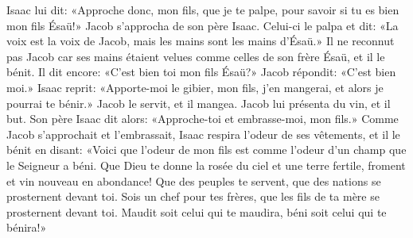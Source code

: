 Isaac lui dit: «Approche donc, mon fils, que je te palpe,
	pour savoir si tu es bien mon fils Ésaü!»
Jacob s’approcha de son père Isaac. Celui-ci le palpa et dit:
	«La voix est la voix de Jacob, mais les mains sont les mains d’Ésaü.»
Il ne reconnut pas Jacob
	car ses mains étaient velues comme celles de son frère Ésaü,
	et il le bénit.
Il dit encore: «C’est bien toi mon fils Ésaü?»
	Jacob répondit: «C’est bien moi.»
Isaac reprit: «Apporte-moi le gibier, mon fils,
	j’en mangerai, et alors je pourrai te bénir.»
Jacob le servit, et il mangea.
	Jacob lui présenta du vin, et il but.
Son père Isaac dit alors:
	«Approche-toi et embrasse-moi, mon fils.»
Comme Jacob s’approchait et l’embrassait,
	Isaac respira l’odeur de ses vêtements, et il le bénit en disant:
	«Voici que l’odeur de mon fils
		est comme l’odeur d’un champ que le Seigneur a béni.
Que Dieu te donne la rosée du ciel et une terre fertile,
	froment et vin nouveau en abondance!
Que des peuples te servent, que des nations se prosternent devant toi.
Sois un chef pour tes frères,
	que les fils de ta mère se prosternent devant toi.
Maudit soit celui qui te maudira, béni soit celui qui te bénira!»
